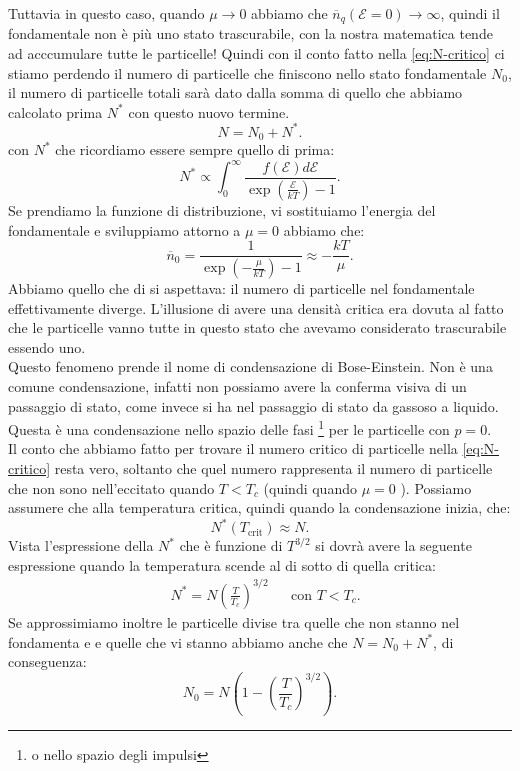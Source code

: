 Tuttavia in questo caso, quando $\mu \to 0$ abbiamo che $\overline{n}_{q}( \mathcal{E} = 0)  \to \infty$, quindi il fondamentale non è più uno stato trascurabile, con la nostra matematica tende ad acccumulare tutte le particelle!
Quindi con il conto fatto nella \ref{eq:N-critico} ci stiamo perdendo il numero di particelle che finiscono nello stato fondamentale $N_0$, il numero di particelle totali sarà dato dalla somma di quello che abbiamo calcolato prima $N^{*}$ con questo nuovo termine.
\[
	N = N_0 + N^{*}
.\] 
con $N^{*}$ che ricordiamo essere sempre quello di prima:
\[
	N^{*} \propto \int_{0}^{\infty} 
	\frac{f( \mathcal{E} ) d\mathcal{E} }
	{\exp\left( \frac{\mathcal{E} }{kT} \right) -1} 
.\] 
Se prendiamo la funzione di distribuzione, vi sostituiamo l'energia del fondamentale e sviluppiamo attorno a $\mu = 0$ abbiamo che:
\[
	\overline{n}_{0} = \frac{1}
		{\exp\left( -\frac{\mu }{kT} \right) -1 } \approx - \frac{kT}{\mu }
.\] 
Abbiamo quello che di si aspettava: il numero di particelle nel fondamentale effettivamente diverge. L'illusione di avere una densità critica era dovuta al fatto che le particelle vanno tutte in questo stato che avevamo considerato trascurabile essendo uno. \\ 
Questo fenomeno prende il nome di condensazione di Bose-Einstein. 
Non è una comune condensazione, infatti non possiamo avere la conferma visiva di un passaggio di stato, come invece si ha nel passaggio di stato da gassoso a liquido. 
Questa è una condensazione nello spazio delle fasi \footnote{o nello spazio degli impulsi} per le particelle con $p =0$. \\
Il conto che abbiamo fatto per trovare il numero critico di particelle nella \ref{eq:N-critico} resta vero, soltanto che quel numero rappresenta il numero di particelle che non sono nell'eccitato quando $T< T_{c}$ (quindi quando $\mu = 0$ ). Possiamo assumere che alla temperatura critica, quindi quando la condensazione inizia, che:
\[
	N^{*}( T_{\text{crit}})  \approx N
.\] 
Vista l'espressione della $N^{*}$ che è funzione di $T^{3 /2}$ si dovrà avere la seguente espressione quando la temperatura scende al di sotto di quella critica:
\begin{align}
	&N^{*} = N \left( \frac{T}{T_{c}} \right)^{3 /2}& & \text{con } T<T_{c}
.\end{align}
Se approssimiamo inoltre le particelle divise tra quelle che non stanno nel fondamenta e e quelle che vi stanno abbiamo anche che $N = N_0 + N^{*}$, di conseguenza:
\[
	N_0 = N\left( 1 -\left( \frac{T}{T_{c}} \right)^{3 /2}
 \right) 
.\] 
